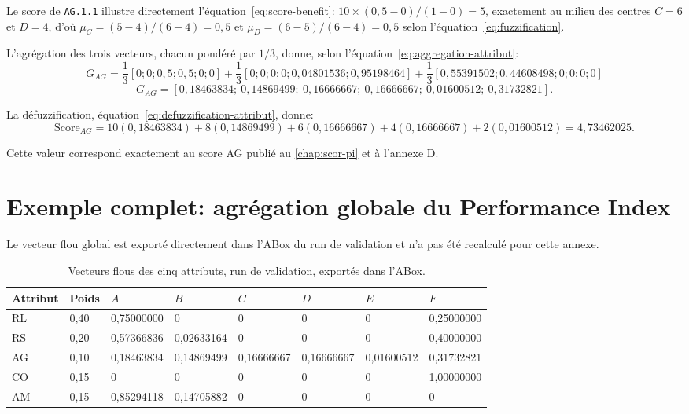 Le score de \texttt{AG.1.1} illustre directement l'équation~\ref{eq:score-benefit}: $10 \times (0{,}5 - 0)/(1-0) = 5$, exactement au milieu des centres $C=6$ et $D=4$, d'où $\mu_C = (5-4)/(6-4) = 0{,}5$ et $\mu_D = (6-5)/(6-4) = 0{,}5$ selon l'équation~\ref{eq:fuzzification}.

L'agrégation des trois vecteurs, chacun pondéré par $1/3$, donne, selon l'équation~\ref{eq:aggregation-attribut}:
\begin{equation}
G_{AG} = \frac{1}{3}[0;0;0{,}5;0{,}5;0;0] + \frac{1}{3}[0;0;0;0;0{,}04801536;0{,}95198464] + \frac{1}{3}[0{,}55391502;0{,}44608498;0;0;0;0]
\label{eq:exemple-ag-aggregation}
\end{equation}
\begin{equation}
G_{AG} = [0{,}18463834;\ 0{,}14869499;\ 0{,}16666667;\ 0{,}16666667;\ 0{,}01600512;\ 0{,}31732821].
\label{eq:exemple-ag-vecteur}
\end{equation}

La défuzzification, équation~\ref{eq:defuzzification-attribut}, donne:
\begin{equation}
\mathrm{Score}_{AG} = 10(0{,}18463834) + 8(0{,}14869499) + 6(0{,}16666667) + 4(0{,}16666667) + 2(0{,}01600512) = 4{,}73462025.
\label{eq:exemple-ag-score}
\end{equation}

Cette valeur correspond exactement au score AG publié au \cref{chap:scor-pi} et à l'annexe D.

\section{Exemple complet: agrégation globale du Performance Index}

Le vecteur flou global est exporté directement dans l'ABox du run de validation et n'a pas été recalculé pour cette annexe.

\begin{table}[H]
  \centering
  \footnotesize
  \setlength{\tabcolsep}{2pt}
  \begin{tabularx}{\textwidth}{L{0.06\textwidth} L{0.05\textwidth} L{0.13\textwidth} L{0.13\textwidth} L{0.13\textwidth} L{0.13\textwidth} L{0.13\textwidth} L{0.13\textwidth}}
    \toprule
    Attribut & Poids & $A$ & $B$ & $C$ & $D$ & $E$ & $F$ \\
    \midrule
    RL & 0,40 & 0,75000000 & 0 & 0 & 0 & 0 & 0,25000000 \\
    RS & 0,20 & 0,57366836 & 0,02633164 & 0 & 0 & 0 & 0,40000000 \\
    AG & 0,10 & 0,18463834 & 0,14869499 & 0,16666667 & 0,16666667 & 0,01600512 & 0,31732821 \\
    CO & 0,15 & 0 & 0 & 0 & 0 & 0 & 1,00000000 \\
    AM & 0,15 & 0,85294118 & 0,14705882 & 0 & 0 & 0 & 0 \\
    \bottomrule
  \end{tabularx}
  \caption{Vecteurs flous des cinq attributs, run de validation, exportés dans l'ABox.}
  \label{tab:exemple-pi-vecteurs}
\end{table}

